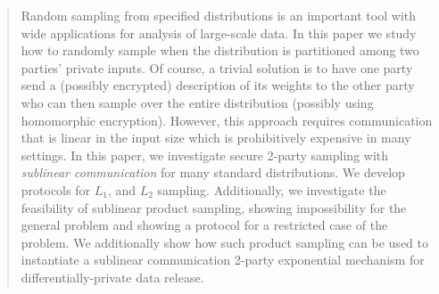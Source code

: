 \begin{abstract}

Random sampling from specified distributions is an important tool with wide applications for analysis of large-scale data.  In this paper we study how to randomly sample when the distribution is partitioned among two parties' private inputs.  Of course, a trivial solution is to have one party send a (possibly encrypted) description of its weights to the other party who can then sample over the entire distribution (possibly using homomorphic encryption).  However, this approach requires communication that is linear in the input size which is prohibitively expensive in many settings.  In this paper, we investigate secure 2-party sampling with \emph{sublinear communication} for many standard distributions.  We develop protocols for $L_1$, and $L_2$ sampling.  Additionally, we investigate the feasibility of sublinear product sampling, showing impossibility for the general problem and showing a protocol for a restricted case of the problem.  We additionally show how such product sampling can be used to instantiate a sublinear communication 2-party exponential mechanism for differentially-private data release.

\end{abstract}